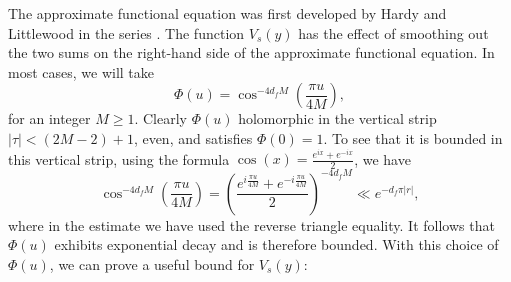     The approximate functional equation was first developed by Hardy and Littlewood in the series \cite{hardyzeros1921,hardyapproximate1923,hardyapproximate1929}. The function $V_{s}(y)$ has the effect of smoothing out the two sums on the right-hand side of the approximate functional equation. In most cases, we will take
    \[
      \Phi(u) = \cos^{-4d_{f}M}\left(\frac{\pi u}{4M}\right),
    \]
    for an integer $M \ge 1$. Clearly $\Phi(u)$ holomorphic in the vertical strip $|\tau| < (2M-2)+1$, even, and satisfies $\Phi(0) = 1$. To see that it is bounded in this vertical strip, using the formula $\cos(x) = \frac{e^{ix}+e^{-ix}}{2}$, we have
    \begin{equation}\label{equ:choice_for_V_decay_estimate}
     \cos^{-4d_{f}M}\left(\frac{\pi u}{4M}\right) = \left(\frac{e^{i\frac{\pi u}{4M}}+e^{-i\frac{\pi u}{4M}}}{2}\right)^{-4d_{f}M} \ll e^{-d_{f}\pi|r|},
    \end{equation}
    where in the estimate we have used the reverse triangle equality. It follows that $\Phi(u)$ exhibits exponential decay and is therefore bounded. With this choice of $ \Phi(u)$, we can prove a useful bound for $V_{s}(y)$:

